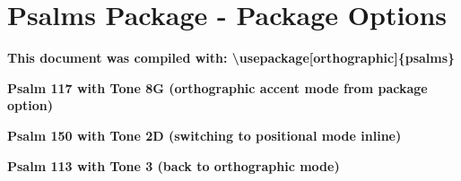 \documentclass{article}
\begin{document}
\section*{Psalms Package - Package Options}

\textbf{This document was compiled with: \textbackslash usepackage[orthographic]\{psalms\}}

\bigskip

\textbf{Psalm 117 with Tone 8G (orthographic accent mode from package option)}


\bigskip

\textbf{Psalm 150 with Tone 2D (switching to positional mode inline)}


\bigskip

\textbf{Psalm 113 with Tone 3 (back to orthographic mode)}

\end{document}

